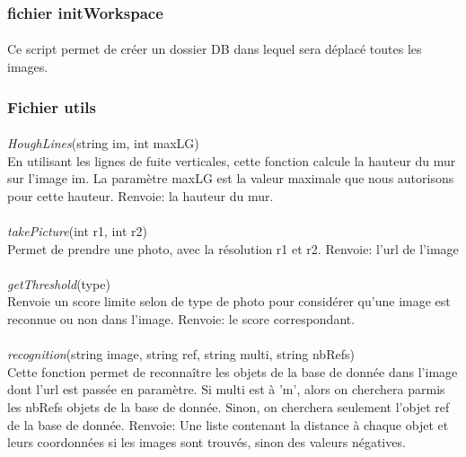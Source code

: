 \documentclass[12pt]{report}
\begin{document}
\subsubsection{fichier initWorkspace}

\paragraph{}
Ce script permet de créer un dossier DB dans lequel sera déplacé toutes les images.

\subsubsection{Fichier utils}
\paragraph{}
\textit{HoughLines}(string im, int maxLG)\\
En utilisant les lignes de fuite verticales, cette fonction calcule la hauteur du mur sur l'image im. La paramètre maxLG est la valeur maximale que nous autorisons pour cette hauteur.
Renvoie: la hauteur du mur.

\paragraph{}
\textit{takePicture}(int r1, int r2)\\
Permet de prendre une photo, avec la résolution r1 et r2.
Renvoie: l'url de l'image

\paragraph{}
\textit{getThreshold}(type)\\
Renvoie un score limite selon de type de photo pour considérer qu'une image est reconnue ou non dans l'image.
Renvoie: le score correspondant.

\paragraph{}
\textit{recognition}(string image, string ref, string multi, string nbRefs)\\
Cette fonction permet de reconnaître les objets de la base de donnée dans l'image dont l'url est passée en paramètre. Si multi est à 'm', alors on cherchera parmis les nbRefs objets de la base de donnée. Sinon, on cherchera seulement l'objet ref de la base de donnée.
Renvoie: Une liste contenant la distance à chaque objet et leurs coordonnées si les images sont trouvés, sinon des valeurs négatives.
\end{document}

